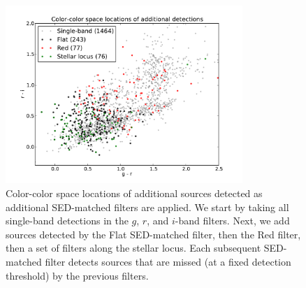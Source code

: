 \documentclass[letterpaper,preprint]{aastex}
\begin{document}
\begin{figure}
\begin{center}
\includegraphics[width=0.8\textwidth]{mdetect-18}
\caption{Color-color space locations of additional sources detected as
  additional SED-matched filters are applied.  We start by taking all
  single-band detections in the $g$, $r$, and $i$-band filters.  Next,
  we add sources detected by the Flat SED-matched filter, then the Red
  filter, then a set of filters along the stellar locus.  Each
  subsequent SED-matched filter detects sources that are missed (at a
  fixed detection threshold) by the previous filters.
  \label{fig:added}}
\end{center}
\end{figure}
\end{document}
